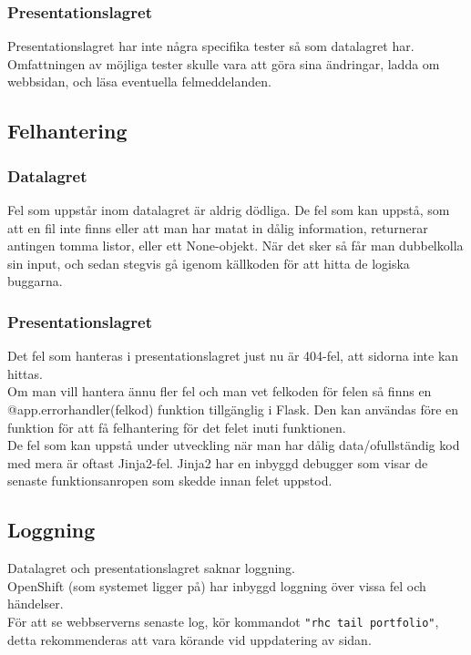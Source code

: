\documentclass{TDP003mall}
\begin{document}
\subsubsection{Presentationslagret}
Presentationslagret har inte några specifika tester så som datalagret har. Omfattningen av möjliga tester skulle vara att göra sina ändringar, ladda om webbsidan, och läsa eventuella felmeddelanden.

\subsection{Felhantering}
\subsubsection{Datalagret}
Fel som uppstår inom datalagret är aldrig dödliga. De fel som kan uppstå, som att en fil inte finns eller att man har matat in dålig information, returnerar antingen tomma listor, eller ett None-objekt. När det sker så får man dubbelkolla sin input, och sedan stegvis gå igenom källkoden för att hitta de logiska buggarna.

\subsubsection{Presentationslagret}
Det fel som hanteras i presentationslagret just nu är 404-fel, att sidorna inte kan hittas.\\
Om man vill hantera ännu fler fel och man vet felkoden för felen så finns en @app.errorhandler(felkod) funktion tillgänglig i Flask. Den kan användas före en funktion för att få felhantering för det felet inuti funktionen.\\
De fel som kan uppstå under utveckling när man har dålig data/ofullständig kod med mera är oftast Jinja2-fel. Jinja2 har en inbyggd debugger som visar de senaste funktionsanropen som skedde innan felet uppstod.

\subsection{Loggning}
Datalagret och presentationslagret saknar loggning.\\
OpenShift (som systemet ligger på) har inbyggd loggning över vissa fel och händelser.\\
För att se webbserverns senaste log, kör kommandot \verb|"rhc tail portfolio"|, detta rekommenderas att vara körande vid uppdatering av sidan.\\
\end{document}
